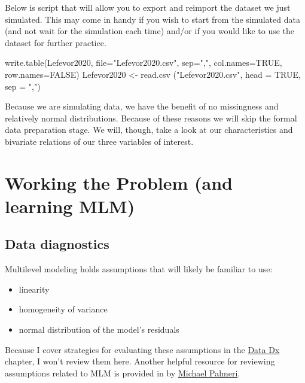\documentclass[
  english,
]{book}
\newenvironment{Shaded}{\begin{snugshade}}{\end{snugshade}}
\newcommand{\AttributeTok}[1]{\textcolor[rgb]{0.77,0.63,0.00}{#1}}
\newcommand{\ConstantTok}[1]{\textcolor[rgb]{0.00,0.00,0.00}{#1}}
\newcommand{\FunctionTok}[1]{\textcolor[rgb]{0.00,0.00,0.00}{#1}}
\newcommand{\NormalTok}[1]{#1}
\newcommand{\OtherTok}[1]{\textcolor[rgb]{0.56,0.35,0.01}{#1}}
\newcommand{\StringTok}[1]{\textcolor[rgb]{0.31,0.60,0.02}{#1}}
\providecommand{\tightlist}{%
  \setlength{\itemsep}{0pt}\setlength{\parskip}{0pt}}
\begin{document}
Below is script that will allow you to export and reimport the dataset we just simulated. This may come in handy if you wish to start from the simulated data (and not wait for the simulation each time) and/or if you would like to use the dataset for further practice.

\begin{Shaded}
\begin{Highlighting}[]
\FunctionTok{write.table}\NormalTok{(Lefevor2020, }\AttributeTok{file=}\StringTok{"Lefevor2020.csv"}\NormalTok{, }\AttributeTok{sep=}\StringTok{","}\NormalTok{, }\AttributeTok{col.names=}\ConstantTok{TRUE}\NormalTok{, }\AttributeTok{row.names=}\ConstantTok{FALSE}\NormalTok{)}
\NormalTok{Lefevor2020 }\OtherTok{\textless{}{-}} \FunctionTok{read.csv}\NormalTok{ (}\StringTok{"Lefevor2020.csv"}\NormalTok{, }\AttributeTok{head =} \ConstantTok{TRUE}\NormalTok{, }\AttributeTok{sep =} \StringTok{","}\NormalTok{)}
\end{Highlighting}
\end{Shaded}

Because we are simulating data, we have the benefit of no missingness and relatively normal distributions. Because of these reasons we will skip the formal data preparation stage. We will, though, take a look at our characteristics and bivariate relations of our three variables of interest.

\hypertarget{working-the-problem-and-learning-mlm}{%
\section{Working the Problem (and learning MLM)}\label{working-the-problem-and-learning-mlm}}

\hypertarget{data-diagnostics}{%
\subsection{Data diagnostics}\label{data-diagnostics}}

Multilevel modeling holds assumptions that will likely be familiar to use:

\begin{itemize}
\tightlist
\item
  linearity
\item
  homogeneity of variance
\item
  normal distribution of the model's residuals
\end{itemize}

Because I cover strategies for evaluating these assumptions in the \href{https://lhbikos.github.io/ReC_MultivModel/DataDx.html}{Data Dx} chapter, I won't review them here. Another helpful resource for reviewing assumptions related to MLM is provided in by \href{https://ademos.people.uic.edu/Chapter18.html\#6_assumptions}{Michael Palmeri}.
\end{document}
